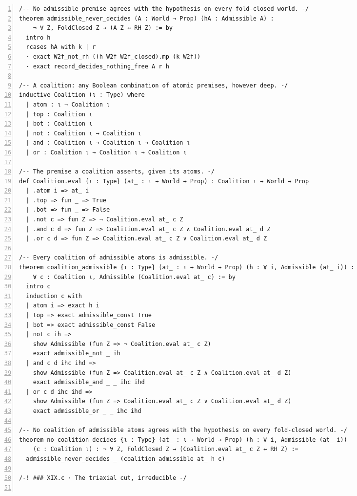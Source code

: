 \documentclass[10pt]{article}
\newcommand{\leansize}{\fontsize{5.5pt}{6.75pt}\selectfont}
\begin{document}
\begin{multicols}{2}
\begin{Verbatim}[numbers=left,firstnumber=1,numbersep=3pt,xleftmargin=2.6em,breaklines=true,breakanywhere=true,breakautoindent=false,breakindent=1.4em,breaksymbolleft={},breakanywheresymbolpre={},fontsize=\leansize]
/-- No admissible premise agrees with the hypothesis on every fold-closed world. -/
theorem admissible_never_decides (A : World → Prop) (hA : Admissible A) :
    ¬ ∀ Z, FoldClosed Z → (A Z ↔ RH Z) := by
  intro h
  rcases hA with k | r
  · exact W2f_not_rh ((h W2f W2f_closed).mp (k W2f))
  · exact record_decides_nothing_free A r h

/-- A coalition: any Boolean combination of atomic premises, however deep. -/
inductive Coalition (ι : Type) where
  | atom : ι → Coalition ι
  | top : Coalition ι
  | bot : Coalition ι
  | not : Coalition ι → Coalition ι
  | and : Coalition ι → Coalition ι → Coalition ι
  | or : Coalition ι → Coalition ι → Coalition ι

/-- The premise a coalition asserts, given its atoms. -/
def Coalition.eval {ι : Type} (at_ : ι → World → Prop) : Coalition ι → World → Prop
  | .atom i => at_ i
  | .top => fun _ => True
  | .bot => fun _ => False
  | .not c => fun Z => ¬ Coalition.eval at_ c Z
  | .and c d => fun Z => Coalition.eval at_ c Z ∧ Coalition.eval at_ d Z
  | .or c d => fun Z => Coalition.eval at_ c Z ∨ Coalition.eval at_ d Z

/-- Every coalition of admissible atoms is admissible. -/
theorem coalition_admissible {ι : Type} (at_ : ι → World → Prop) (h : ∀ i, Admissible (at_ i)) :
    ∀ c : Coalition ι, Admissible (Coalition.eval at_ c) := by
  intro c
  induction c with
  | atom i => exact h i
  | top => exact admissible_const True
  | bot => exact admissible_const False
  | not c ih =>
    show Admissible (fun Z => ¬ Coalition.eval at_ c Z)
    exact admissible_not _ ih
  | and c d ihc ihd =>
    show Admissible (fun Z => Coalition.eval at_ c Z ∧ Coalition.eval at_ d Z)
    exact admissible_and _ _ ihc ihd
  | or c d ihc ihd =>
    show Admissible (fun Z => Coalition.eval at_ c Z ∨ Coalition.eval at_ d Z)
    exact admissible_or _ _ ihc ihd

/-- No coalition of admissible atoms agrees with the hypothesis on every fold-closed world. -/
theorem no_coalition_decides {ι : Type} (at_ : ι → World → Prop) (h : ∀ i, Admissible (at_ i))
    (c : Coalition ι) : ¬ ∀ Z, FoldClosed Z → (Coalition.eval at_ c Z ↔ RH Z) :=
  admissible_never_decides _ (coalition_admissible at_ h c)

/-! ### XIX.c · The triaxial cut, irreducible -/


\end{Verbatim}
\end{multicols}
\end{document}
